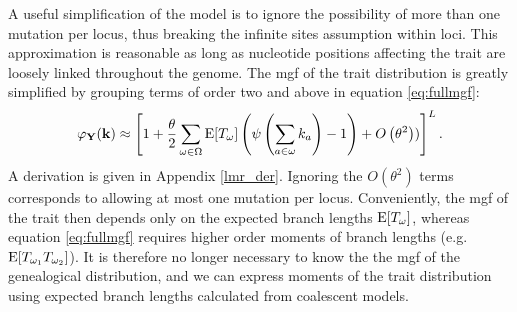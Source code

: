 A useful simplification of the model is to ignore the possibility of more than
one mutation per locus, thus breaking the infinite sites assumption within loci.
This approximation is reasonable as long as nucleotide positions affecting the
trait are loosely linked throughout the genome. The mgf of the trait
distribution is greatly simplified by grouping terms of order two and above in
equation
\eqref{eq:fullmgf}:
\begin{equation}
\label{eq:lowmut}
\varphi_{\mathbf{Y}}(\mathbf{k}) \approx \left[ 1 + \frac{\theta}{2} \sum_{\omega \in \Omega}
  \mathrm{E}[T_\omega] \left( \psi\left( \sum_{a \in \omega} k_a\right) -1 \right) +
  O\left( \theta^2 \right))\right]^L.
\end{equation}
A derivation is given in Appendix \ref{lmr_der}. Ignoring the
$O\left( \theta^2 \right)$ terms corresponds to allowing at most one mutation
per locus. Conveniently, the mgf of the trait then depends only on the expected
branch lengths $\mathrm{E}[T_{\omega}]$, whereas equation \eqref{eq:fullmgf} requires higher order
moments of branch lengths (e.g. $\mathrm{E}[T_{\omega_1}T_{\omega_2}]$). It is therefore
no longer necessary to know the the mgf of the genealogical distribution, and we
can express moments of the trait distribution using expected branch lengths
calculated from coalescent models.

